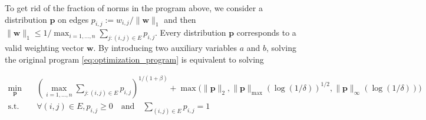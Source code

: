 \documentclass[letterpaper]{article} %
\def\DoubleColumn{}
\def\DoubleColumnEnd{}
\def\SingleColumn{}
\def\SingleColumnEnd{}
\newcommand{\weight}{\mathbf{w}}
\newcommand{\probdistri}{\mathbf{p}}
\newcommand{\pair}[1]{(#1)}
\newcommand{\normo}[1]{\|#1\|_1}
\newcommand{\complexbound}{\beta}
\begin{document}
To get rid of the fraction of norms in the program above, we consider a distribution $\probdistri{}$ on edges $p_{i,j}:=w_{i,j}/\normo{\weight{}}$ and then 
$\normo{\weight{}} \le 1/\max_{i=1,\dots,n} \sum_{j:\pair{i,j}\in E} p_{i,j}.$
Every distribution $\probdistri{}$ corresponds to a valid weighting vector $\weight{}$. 
By introducing two auxiliary variables $a$ and $b$, solving the original program \eqref{eq:optimization_program} is equivalent to solving
\SingleColumn
\begin{equation}
    \label{eq:optimization_program_1}
\begin{aligned}
    \min_{\probdistri{}} &\quad
    (\max_{i=1,\dots,n} \sum_{j:\pair{i,j}\in E} p_{i,j})^{1/(1+\complexbound{})}+\max\Big(\|\probdistri{}\|_2,\|\probdistri{}\|_{\max}(\log(1/\delta))^{1/2},
    \|\probdistri{}\|_\infty(\log(1/\delta))\Big)\\
    \mbox{s.t.} &\quad \forall \pair{i,j}\in E, p_{i,j}\ge 0 \quad \mbox{and} \quad \sum_{\pair{i,j}\in E} p_{i,j}= 1
\end{aligned}
\end{equation}
\SingleColumnEnd


\end{document}
